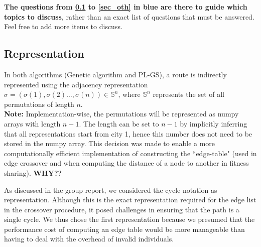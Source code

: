 \documentclass[a4paper,10pt]{article}
\newcommand{\ReplaceMe}[1]{{\color{blue}#1}}
\newcommand{\RemoveMe}[1]{{\color{purple}#1}}
\begin{document}
	
	
	
		
	
		
	
	
	\RemoveMe{\textbf{The questions from \cref{sec_rep} to \cref{sec_oth} in blue are there to guide which topics to discuss}, rather than an exact list of questions that must be answered. Feel free to add more items to discuss.}

\subsection{Representation}\label{sec_rep}
	
	In both algorithms (Genetic algorithm and PL-GS), a route is indirectly represented using the adjacency representation $\sigma = \left( \sigma(1), \sigma(2) \dots, \sigma(n) \right) \in \mathbb{S}^n$, where $\mathbb{S}^n$ represents the set of all permutations of length $n$.\\
	\textbf{Note:} Implementation-wise, the permutations will be represented as numpy arrays with length $n-1$. The length can be set to $n-1$ by implicitly inferring that all representations start from city 1, hence this number does not need to be stored in the numpy array. This decision was made to enable a more computationally efficient implementation of constructing the ``edge-table" (used in edge crossover and when computing the distance of a node to another in fitness sharing). \textbf{WHY??}
	
	As discussed in the group report, we considered the cycle notation as representation. Although this is the exact representation required for the edge list in the crossover procedure, it posed challenges in ensuring that the path is a single cycle. We thus chose the first representation because we presumed that the performance cost of computing an edge table would be more manageable than having to deal with the overhead of invalid individuals.
	
\end{document}
